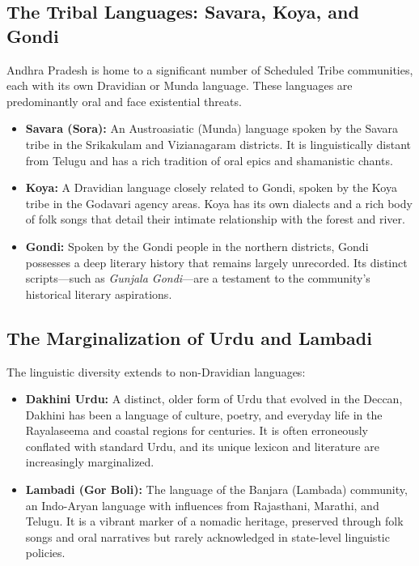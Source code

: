 \documentclass{article}
\begin{document}
\subsection{The Tribal Languages: Savara, Koya, and Gondi}
Andhra Pradesh is home to a significant number of Scheduled Tribe communities, each with its own Dravidian or Munda language. These languages are predominantly oral and face existential threats.
\begin{itemize}
    \item \textbf{Savara (Sora):} An Austroasiatic (Munda) language spoken by the Savara tribe in the Srikakulam and Vizianagaram districts. It is linguistically distant from Telugu and has a rich tradition of oral epics and shamanistic chants.
    \item \textbf{Koya:} A Dravidian language closely related to Gondi, spoken by the Koya tribe in the Godavari agency areas. Koya has its own dialects and a rich body of folk songs that detail their intimate relationship with the forest and river.
    \item \textbf{Gondi:} Spoken by the Gondi people in the northern districts, Gondi possesses a deep literary history that remains largely unrecorded. Its distinct scripts—such as \textit{Gunjala Gondi}—are a testament to the community's historical literary aspirations.
\end{itemize}

\subsection{The Marginalization of Urdu and Lambadi}
The linguistic diversity extends to non-Dravidian languages:
\begin{itemize}
    \item \textbf{Dakhini Urdu:} A distinct, older form of Urdu that evolved in the Deccan, Dakhini has been a language of culture, poetry, and everyday life in the Rayalaseema and coastal regions for centuries. It is often erroneously conflated with standard Urdu, and its unique lexicon and literature are increasingly marginalized.
    \item \textbf{Lambadi (Gor Boli):} The language of the Banjara (Lambada) community, an Indo-Aryan language with influences from Rajasthani, Marathi, and Telugu. It is a vibrant marker of a nomadic heritage, preserved through folk songs and oral narratives but rarely acknowledged in state-level linguistic policies.
\end{itemize}
\end{document}
